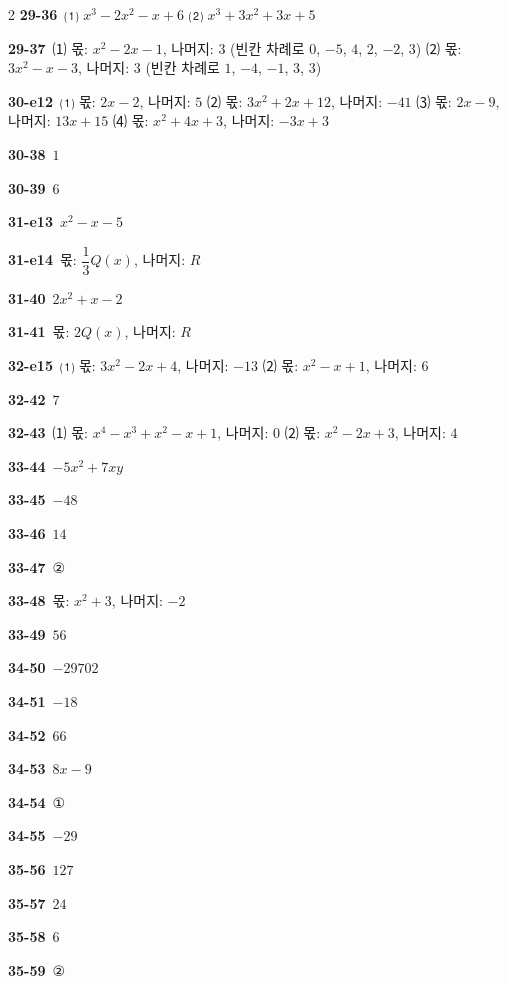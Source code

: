 \documentclass[10pt,a4paper]{article}
\begin{document}
\begin{multicols}{2}
\noindent\textbf{29-36}\ ⑴ $x^3-2x^2-x+6$ \quad ⑵ $x^3+3x^2+3x+5$\par
\noindent\textbf{29-37}\ ⑴ 몫: $x^2-2x-1$, 나머지: $3$ (빈칸 차례로 $0$, $-5$, $4$, $2$, $-2$, $3$) \quad ⑵ 몫: $3x^2-x-3$, 나머지: $3$ (빈칸 차례로 $1$, $-4$, $-1$, $3$, $3$)\par
\noindent\textbf{30-e12}\ ⑴ 몫: $2x-2$, 나머지: $5$ \quad ⑵ 몫: $3x^2+2x+12$, 나머지: $-41$ \quad ⑶ 몫: $2x-9$, 나머지: $13x+15$ \quad ⑷ 몫: $x^2+4x+3$, 나머지: $-3x+3$\par
\noindent\textbf{30-38}\ $1$\par
\noindent\textbf{30-39}\ $6$\par
\noindent\textbf{31-e13}\ $x^2-x-5$\par
\noindent\textbf{31-e14}\ 몫: $\dfrac{1}{3}Q(x)$, 나머지: $R$\par
\noindent\textbf{31-40}\ $2x^2+x-2$\par
\noindent\textbf{31-41}\ 몫: $2Q(x)$, 나머지: $R$\par
\noindent\textbf{32-e15}\ ⑴ 몫: $3x^2-2x+4$, 나머지: $-13$ \quad ⑵ 몫: $x^2-x+1$, 나머지: $6$\par
\noindent\textbf{32-42}\ $7$\par
\noindent\textbf{32-43}\ ⑴ 몫: $x^4-x^3+x^2-x+1$, 나머지: $0$ \quad ⑵ 몫: $x^2-2x+3$, 나머지: $4$\par
\noindent\textbf{33-44}\ $-5x^2+7xy$\par
\noindent\textbf{33-45}\ $-48$\par
\noindent\textbf{33-46}\ $14$\par
\noindent\textbf{33-47}\ ②\par
\noindent\textbf{33-48}\ 몫: $x^2+3$, 나머지: $-2$\par
\noindent\textbf{33-49}\ $56$\par
\noindent\textbf{34-50}\ $-29702$\par
\noindent\textbf{34-51}\ $-18$\par
\noindent\textbf{34-52}\ $66$\par
\noindent\textbf{34-53}\ $8x-9$\par
\noindent\textbf{34-54}\ ①\par
\noindent\textbf{34-55}\ $-29$\par
\noindent\textbf{35-56}\ $127$\par
\noindent\textbf{35-57}\ $24$\par
\noindent\textbf{35-58}\ $6$\par
\noindent\textbf{35-59}\ ②\par

\end{multicols}
\end{document}
